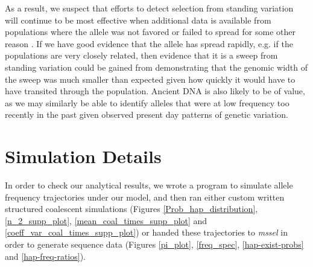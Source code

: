 \documentclass[a4paper,10pt]{article}
\begin{document}
As a result, we suspect that efforts to detect selection from standing variation will continue to be most effective when additional data is available from populations where the allele was not favored or failed to spread for some other reason \citep{Innan:2008ii,Chen:2010ic,Roesti:2014gp}. If we have good evidence that the allele has spread rapidly, e.g. if the populations are very closely related, then evidence that it is a sweep from standing variation could be gained from demonstrating that the genomic width of the sweep was much smaller than expected given how quickly it would have to have transited through the population. Ancient DNA is also likely to be of value, as we may similarly be able to identify alleles that were at low frequency too recently in the past given observed present day patterns of genetic variation.


\section*{Simulation Details}

In order to check our analytical results, we wrote a program to simulate allele frequency trajectories under our model, and then ran either custom written structured coalescent simulations (Figures \ref{Prob_hap_distribution}, \ref{n_2_supp_plot}, \ref{mean_coal_times_supp_plot} and \ref{coeff_var_coal_times_supp_plot}) or handed these trajectories to \textit{mssel} in order to generate sequence data (Figures \ref{pi_plot}, \ref{freq_spec}, \ref{hap-exist-probs} and \ref{hap-freq-ratios}).
\end{document}
